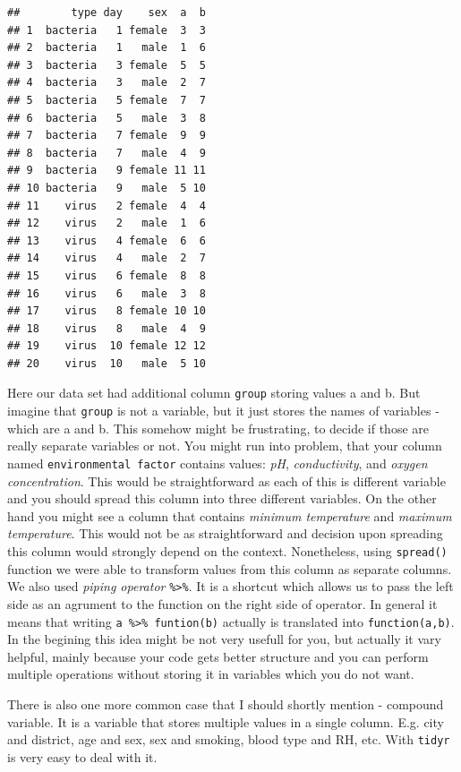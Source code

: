 \documentclass[]{book}
\theoremstyle{definition}
\theoremstyle{definition}
\theoremstyle{definition}
\theoremstyle{remark}
\begin{document}
\begin{verbatim}
##        type day    sex  a  b
## 1  bacteria   1 female  3  3
## 2  bacteria   1   male  1  6
## 3  bacteria   3 female  5  5
## 4  bacteria   3   male  2  7
## 5  bacteria   5 female  7  7
## 6  bacteria   5   male  3  8
## 7  bacteria   7 female  9  9
## 8  bacteria   7   male  4  9
## 9  bacteria   9 female 11 11
## 10 bacteria   9   male  5 10
## 11    virus   2 female  4  4
## 12    virus   2   male  1  6
## 13    virus   4 female  6  6
## 14    virus   4   male  2  7
## 15    virus   6 female  8  8
## 16    virus   6   male  3  8
## 17    virus   8 female 10 10
## 18    virus   8   male  4  9
## 19    virus  10 female 12 12
## 20    virus  10   male  5 10
\end{verbatim}

Here our data set had additional column \texttt{group} storing values a
and b. But imagine that \texttt{group} is not a variable, but it just
stores the names of variables - which are a and b. This somehow might be
frustrating, to decide if those are really separate variables or not.
You might run into problem, that your column named
\texttt{environmental\ factor} contains values: \emph{pH},
\emph{conductivity}, and \emph{oxygen concentration}. This would be
straightforward as each of this is different variable and you should
spread this column into three different variables. On the other hand you
might see a column that contains \emph{minimum temperature} and
\emph{maximum temperature}. This would not be as straightforward and
decision upon spreading this column would strongly depend on the
context. Nonetheless, using \texttt{spread()} function we were able to
transform values from this column as separate columns. We also used
\emph{piping operator} \texttt{\%\textgreater{}\%}. It is a shortcut
which allows us to pass the left side as an agrument to the function on
the right side of operator. In general it means that writing
\texttt{a\ \%\textgreater{}\%\ funtion(b)} actually is translated into
\texttt{function(a,b)}. In the begining this idea might be not very
usefull for you, but actually it vary helpful, mainly because your code
gets better structure and you can perform multiple operations without
storing it in variables which you do not want.

There is also one more common case that I should shortly mention -
compound variable. It is a variable that stores multiple values in a
single column. E.g. city and district, age and sex, sex and smoking,
blood type and RH, etc. With \texttt{tidyr} is very easy to deal with
it.
\end{document}
